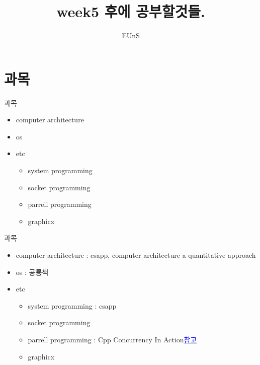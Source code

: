 \documentclass[10pt]{beamer}
\title{week5 후에 공부할것들.}
\author{EUnS}
\begin{document}
\begin{frame}
    \tableofcontents
\end{frame}    

\section{과목}

\begin{frame}{과목}
    \begin{itemize}
        \item computer architecture
        \item os
        \item etc
        \begin{itemize}
            \item system programming
            \item socket programming
            \item parrell programming
            \item graphicx
        \end{itemize}
    \end{itemize}
\end{frame}

\begin{frame}{과목}
    \begin{itemize}
        \item computer architecture : csapp, computer architecture a quantitative approach
        \item os : 공룡책
        \item etc
        \begin{itemize}
            \item system programming : csapp
            \item socket programming 
            \item parrell programming : Cpp Concurrency In Action\href{https://github.com/CppKorea/CppConcurrencyInAction}{\textcolor{blue}{참고}}
            \item graphicx
        \end{itemize}
    \end{itemize}
\end{frame}
\end{document}
